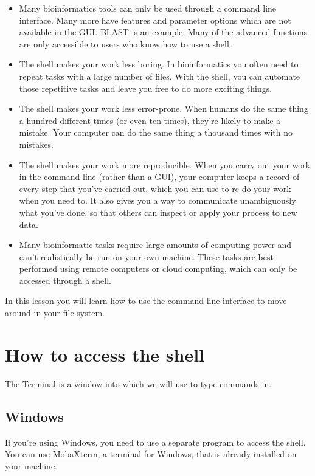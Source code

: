 \documentclass[
  letterpaper,
  DIV=11,
  numbers=noendperiod]{scrreprt}
\begin{document}
\begin{itemize}
\item
  Many bioinformatics tools can only be used through a command line
  interface. Many more have features and parameter options which are not
  available in the GUI. BLAST is an example. Many of the advanced
  functions are only accessible to users who know how to use a shell.
\item
  The shell makes your work less boring. In bioinformatics you often
  need to repeat tasks with a large number of files. With the shell, you
  can automate those repetitive tasks and leave you free to do more
  exciting things.
\item
  The shell makes your work less error-prone. When humans do the same
  thing a hundred different times (or even ten times), they're likely to
  make a mistake. Your computer can do the same thing a thousand times
  with no mistakes.
\item
  The shell makes your work more reproducible. When you carry out your
  work in the command-line (rather than a GUI), your computer keeps a
  record of every step that you've carried out, which you can use to
  re-do your work when you need to. It also gives you a way to
  communicate unambiguously what you've done, so that others can inspect
  or apply your process to new data.
\item
  Many bioinformatic tasks require large amounts of computing power and
  can't realistically be run on your own machine. These tasks are best
  performed using remote computers or cloud computing, which can only be
  accessed through a shell.
\end{itemize}

In this lesson you will learn how to use the command line interface to
move around in your file system.

\section{How to access the shell}\label{how-to-access-the-shell}

The Terminal is a window into which we will use to type commands in.

\subsection{Windows}\label{sec-}

If you're using Windows, you need to use a separate program to access
the shell. You can use \href{https://mobaxterm.mobatek.net/}{MobaXterm},
a terminal for Windows, that is already installed on your machine.
\end{document}
